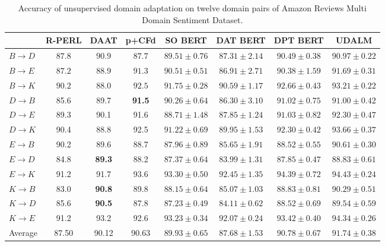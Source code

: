 \documentclass[11pt]{article}
\begin{document}
\begin{table*}[ht]
\centering
\small
\begin{tabular}{||l| c c c | c c c c||}
\hline
                    & R-PERL & DAAT & p+CFd & SO BERT & DAT BERT & DPT BERT & UDALM \\
\hline
    $B \rightarrow D$ & $87.8$ & $90.9$ & $87.7$ & $89.51 \pm 0.76$ & $87.31 \pm 2.14$ & $90.49 \pm 0.38$ & $\mathbf{90.97} \pm 0.22$ \\
    $B \rightarrow E$ & $87.2$ & $88.9$ & $91.3$ & $90.51 \pm 0.51$ & $86.91 \pm 2.71$ & $90.38 \pm 1.59$ & $\mathbf{91.69} \pm 0.31$ \\
    $B \rightarrow K$ & $90.2$ & $88.0$ & $92.5$ & $91.75 \pm 0.28$ & $90.59 \pm 1.17$ & $92.66 \pm 0.43$ & $\mathbf{93.21} \pm 0.22$ \\
    $D \rightarrow B$ & 85.6 & 89.7 & \textbf{91.5} & $90.26 \pm 0.64$ & $86.30 \pm 3.10$ & $91.02 \pm 0.75$ & $91.00 \pm 0.42$ \\
    $D \rightarrow E$ & 89.3 & 90.1 & 91.6 & $88.71 \pm 1.48$ & $87.85 \pm 1.24$ & $91.03 \pm 0.82$ & $\mathbf{92.30} \pm 0.47$ \\
    $D \rightarrow K$ & 90.4 & 88.8 & 92.5 & $91.22 \pm 0.69$ & $89.95 \pm 1.53$ & $92.30 \pm 0.42$ & $\mathbf{93.66} \pm 0.37$ \\
    $E \rightarrow B$ & 90.2 & 89.6 & 88.7 & $87.96 \pm 0.89$ & $85.65 \pm 1.91$ & $88.52 \pm 0.55$ & $\mathbf{90.61} \pm 0.30$ \\
    $E \rightarrow D$ & 84.8 & \textbf{89.3} & 88.2 & $87.37 \pm 0.64$ & $83.99 \pm 1.31$ & $87.85 \pm 0.47$ & $88.83 \pm 0.61$ \\
    $E \rightarrow K$ & 91.2 & 91.7 & 93.6 & $93.30 \pm 0.50$ & $92.45 \pm 1.35$ & $94.39 \pm 0.72$ & $\mathbf{94.43} \pm 0.24$ \\
    $K \rightarrow B$ & 83.0 & \textbf{90.8} & 89.8 & $88.15 \pm 0.64$ & $85.07 \pm 1.03$ & $88.83 \pm 0.81$ & $90.29 \pm 0.51$ \\
    $K \rightarrow D$ & 85.6 & \textbf{90.5} & 87.8 & $87.23 \pm 0.49$ & $84.11 \pm 0.62$ & $88.52 \pm 0.69$ & $89.54 \pm 0.59$ \\
    $K \rightarrow E$ & 91.2 & 93.2 & 92.6 & $93.23 \pm 0.34$ & $92.07 \pm 0.24$ & $93.42 \pm 0.40$ & $\mathbf{94.34} \pm 0.26$ \\
    \hline
    Average & 87.50 & 90.12 & 90.63 & $89.93 \pm 0.65$ & $87.68 \pm 1.53$ & $90.78 \pm 0.67$ & $\mathbf{91.74} \pm 0.38$  \\
    \hline
\end{tabular}
\caption{Accuracy of unsupervised domain adaptation on twelve domain pairs of Amazon Reviews Multi Domain Sentiment Dataset.}
\label{tab:results}
\end{table*}
\end{document}
